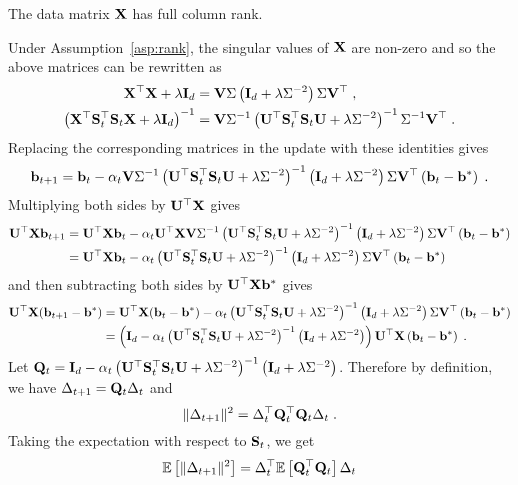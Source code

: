 \begin{assumption} \label{asp:rank}
The data matrix $\mathbf{X}$ has full column rank.
\end{assumption}

Under Assumption~\ref{asp:rank}, the singular values of $\mathbf{X}$ are non-zero and so the above matrices can be rewritten as
\begin{align*}
\mathbf{X}^\top\mathbf{X}+\lambda\mathbf{I}_d &= \mathbf{V}\Sigma\left(\mathbf{I}_d + \lambda\Sigma^{-2}\right)\Sigma\mathbf{V}^\top \;, \\
\left(\mathbf{X}^\top\mathbf{S}_t^\top\mathbf{S}_t\mathbf{X} + \lambda\mathbf{I}_d\right)^{-1} &= \mathbf{V}\Sigma^{-1}\left(\mathbf{U}^\top\mathbf{S}_t^\top\mathbf{S}_t\mathbf{U} + \lambda\Sigma^{-2}\right)^{-1}\Sigma^{-1}\mathbf{V}^\top \;.
\end{align*}
Replacing the corresponding matrices in the update with these identities gives
\[
\mathbf{b}_{t+1} = \mathbf{b}_t - \alpha_t\mathbf{V}\Sigma^{-1}\left(\mathbf{U}^\top\mathbf{S}_t^\top\mathbf{S}_t\mathbf{U} + \lambda\Sigma^{-2}\right)^{-1}\left(\mathbf{I}_d + \lambda\Sigma^{-2} \right)\Sigma\mathbf{V}^\top\left(\mathbf{b}_t-\mathbf{b}^*\right) \;.
\]
Multiplying both sides by $\mathbf{U}^\top\mathbf{X}$ gives
\begin{align*}
\mathbf{U}^\top\mathbf{X}\mathbf{b}_{t+1} &= \mathbf{U}^\top\mathbf{X}\mathbf{b}_t - \alpha_t\mathbf{U}^\top\mathbf{X}\mathbf{V}\Sigma^{-1}\left(\mathbf{U}^\top\mathbf{S}_t^\top\mathbf{S}_t\mathbf{U} + \lambda\Sigma^{-2}\right)^{-1}\left(\mathbf{I}_d + \lambda\Sigma^{-2} \right)\Sigma\mathbf{V}^\top\left(\mathbf{b}_t-\mathbf{b}^*\right) \\
&= \mathbf{U}^\top\mathbf{X}\mathbf{b}_t - \alpha_t\left(\mathbf{U}^\top\mathbf{S}_t^\top\mathbf{S}_t\mathbf{U} + \lambda\Sigma^{-2}\right)^{-1}\left(\mathbf{I}_d + \lambda\Sigma^{-2} \right)\Sigma\mathbf{V}^\top\left(\mathbf{b}_t-\mathbf{b}^*\right)
\end{align*}
and then subtracting both sides by $\mathbf{U}^\top\mathbf{X}\mathbf{b}^*$ gives
\begin{align*}
\mathbf{U}^\top\mathbf{X}(\mathbf{b}_{t+1}-\mathbf{b}^*) &= \mathbf{U}^\top\mathbf{X}(\mathbf{b}_t-\mathbf{b}^*) - \alpha_t\left(\mathbf{U}^\top\mathbf{S}_t^\top\mathbf{S}_t\mathbf{U} + \lambda\Sigma^{-2}\right)^{-1}\left(\mathbf{I}_d + \lambda\Sigma^{-2} \right)\Sigma\mathbf{V}^\top\left(\mathbf{b}_t-\mathbf{b}^*\right) \\
&= \left(\mathbf{I}_d - \alpha_t\left(\mathbf{U}^\top\mathbf{S}_t^\top\mathbf{S}_t\mathbf{U} + \lambda\Sigma^{-2}\right)^{-1}\left(\mathbf{I}_d + \lambda\Sigma^{-2}\right)\right)\mathbf{U}^\top\mathbf{X}\left(\mathbf{b}_t-\mathbf{b}^*\right) \;.
\end{align*}
Let $\mathbf{Q}_t=\mathbf{I}_d - \alpha_t\left(\mathbf{U}^\top\mathbf{S}_t^\top\mathbf{S}_t\mathbf{U} + \lambda\Sigma^{-2}\right)^{-1}\left(\mathbf{I}_d + \lambda\Sigma^{-2}\right)$. Therefore by definition, we have $\Delta_{t+1} = \mathbf{Q}_t\Delta_t$ and
\[
\|\Delta_{t+1}\|^2 = \Delta_t^\top\mathbf{Q}_t^\top\mathbf{Q}_t\Delta_t \;.
\]
Taking the expectation with respect to $\mathbf{S}_t$, we get
\[
\mathbb{E}\left[\|\Delta_{t+1}\|^2\right] = \Delta_t^\top\mathbb{E}\left[\mathbf{Q}_t^\top\mathbf{Q}_t\right]\Delta_t
\]
